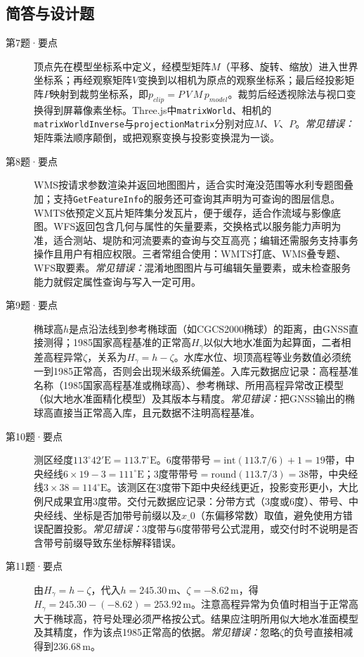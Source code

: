 \subsection*{简答与设计题}
\begin{description}
  \item[第7题·要点] 顶点先在模型坐标系中定义，经模型矩阵$M$（平移、旋转、缩放）进入世界坐标系；再经观察矩阵$V$变换到以相机为原点的观察坐标系；最后经投影矩阵$P$映射到裁剪坐标系，即$p_{clip}=P\,V\,M\,p_{model}$。裁剪后经透视除法与视口变换得到屏幕像素坐标。Three.js中\texttt{matrixWorld}、相机的\texttt{matrixWorldInverse}与\texttt{projectionMatrix}分别对应$M$、$V$、$P$。\textit{常见错误：}矩阵乘法顺序颠倒，或把观察变换与投影变换混为一谈。
  \item[第8题·要点] WMS按请求参数渲染并返回地图图片，适合实时淹没范围等水利专题图叠加；支持\texttt{GetFeatureInfo}的服务还可查询其声明为可查询的图层信息。WMTS依预定义瓦片矩阵集分发瓦片，便于缓存，适合作流域与影像底图。WFS返回包含几何与属性的矢量要素，交换格式以服务能力声明为准，适合测站、堤防和河流要素的查询与交互高亮；编辑还需服务支持事务操作且用户有相应权限。三者常组合使用：WMTS打底、WMS叠专题、WFS取要素。\textit{常见错误：}混淆地图图片与可编辑矢量要素，或未检查服务能力就假定属性查询与写入一定可用。
  \item[第9题·要点] 椭球高$h$是点沿法线到参考椭球面（如CGCS2000椭球）的距离，由GNSS直接测得；1985国家高程基准的正常高$H_\gamma$以似大地水准面为起算面，二者相差高程异常$\zeta$，关系为$H_\gamma=h-\zeta$。水库水位、坝顶高程等业务数值必须统一到1985正常高，否则会出现米级系统偏差。入库元数据应记录：高程基准名称（1985国家高程基准或椭球高）、参考椭球、所用高程异常改正模型（似大地水准面精化模型）及其版本与精度。\textit{常见错误：}把GNSS输出的椭球高直接当正常高入库，且元数据不注明高程基准。
  \item[第10题·要点] 测区经度$113^\circ 42'\mathrm{E}=113.7^\circ\mathrm{E}$。6度带带号$=\mathrm{int}(113.7/6)+1=19$带，中央经线$6\times 19-3=111^\circ\mathrm{E}$；3度带带号$=\mathrm{round}(113.7/3)=38$带，中央经线$3\times 38=114^\circ\mathrm{E}$。该测区在3度带下距中央经线更近，投影变形更小，大比例尺成果宜用3度带。交付元数据应记录：分带方式（3度或6度）、带号、中央经线、坐标是否加带号前缀以及$x\_0$（东偏移常数）取值，避免使用方错误配置投影。\textit{常见错误：}3度带与6度带带号公式混用，或交付时不说明是否含带号前缀导致东坐标解释错误。
  \item[第11题·要点] 由$H_\gamma=h-\zeta$，代入$h=245.30\,\mathrm{m}$、$\zeta=-8.62\,\mathrm{m}$，得$H_\gamma=245.30-(-8.62)=253.92\,\mathrm{m}$。注意高程异常为负值时相当于正常高大于椭球高，符号处理必须严格按公式。结果应注明所用似大地水准面模型及其精度，作为该点1985正常高的依据。\textit{常见错误：}忽略$\zeta$的负号直接相减得到$236.68\,\mathrm{m}$。

\end{description}
